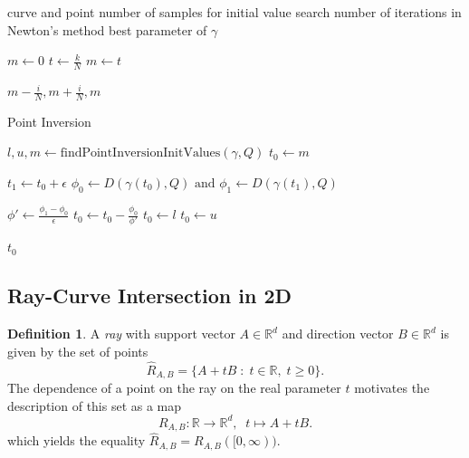 \documentclass[a4paper, 11pt]{report}
\theoremstyle{definition}
\newtheorem{definition}{Definition}[section]
\renewcommand{\emph}[1]{\textit{#1}}
\newcommand{\Desc}[2]{\State \makebox[12em][l]{#1}#2}
\begin{document}
	\begin{algorithm}[H]
		\begin{algorithmic}[1]
			\Input
				\Desc{$\gamma, Q$}{curve and point}
				\Desc{$N$}{number of samples for initial value search}
				\Desc{$M$}{number of iterations in Newton's method}
			\EndInput
			\Output
				\Desc{$t^*$}{best parameter of $\gamma$}
			\EndOutput
			
				\State $m \gets 0$
					\State $t \gets \frac{k}{N}$
						$m \gets t$
					\EndIf
				\EndFor

				\Return $m-\frac{i}{N}, m+\frac{i}{N}, m$
			\EndProcedure

			\caption{Point Inversion}\label{alg:pointinversion}
				\State $l, u, m \gets \text{findPointInversionInitValues}(\gamma, Q)$
				\State $t_0 \gets m$

					\State $t_1 \gets t_0 + \epsilon$
					\State $\phi_0 \gets D(\gamma(t_0), Q) \text{ and } \phi_1 \gets D(\gamma(t_1), Q)$
					
					\State $\phi' \gets \frac{\phi_1 - \phi_0}{\epsilon}$
					\State $t_0 \gets t_0 - \frac{\phi_0}{\phi'}$
					 $t_0 \gets l$ \EndIf
					 $t_0 \gets u$ \EndIf

				\EndFor

				\Return $t_0$
			\EndProcedure
		\end{algorithmic}
	\end{algorithm}

\subsection{Ray-Curve Intersection in 2D}
	\begin{definition}
		A \emph{ray} with support vector $A \in \mathbb{R}^d$ and direction vector $B \in \mathbb{R}^d$ is given by the set of points
			\begin{equation*}
				\hat R_{A,B} = \{A + tB \;:\; t \in \mathbb{R},\; t \geq 0\}.
			\end{equation*}
		The dependence of a point on the ray on the real parameter $t$ motivates the description of this set as a map
			$$R_{A,B}: \mathbb{R} \rightarrow \mathbb{R}^d,\;\; t \mapsto A+tB.$$
		which yields the equality $\hat R_{A,B} = R_{A,B}([0,\infty))$.
	\end{definition}
\end{document}
